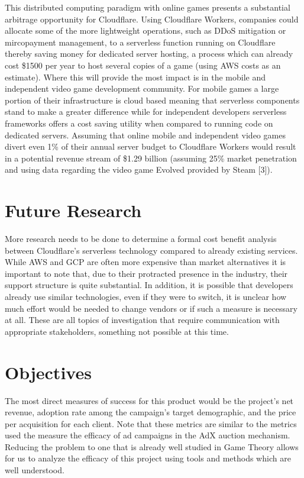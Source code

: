 \documentclass[a4paper, 11pt]{article}
\begin{document}
This distributed computing paradigm with online games presents a substantial arbitrage opportunity for Cloudflare. Using Cloudflare Workers, companies could allocate some of the more lightweight operations, such as DDoS mitigation or mircopayment management, to a serverless function running on Cloudflare thereby saving money for dedicated server hosting, a process which can already cost \$1500 per year to host several copies of a game (using AWS costs as an estimate). Where this will provide the most impact is in the mobile and independent video game development community. For mobile games a large portion of their infrastructure is cloud based meaning that serverless components stand to make a greater difference while for independent developers serverless frameworks offers a cost saving utility when compared to running code on dedicated servers. Assuming that online mobile and independent video games divert even 1\% of their annual server budget to Cloudflare Workers would result in a potential revenue stream of \$1.29 billion (assuming 25\% market penetration and using data regarding the video game Evolved provided by Steam [3]).

\section{Future Research}

More research needs to be done to determine a formal cost benefit analysis between Cloudflare's serverless technology compared to already existing services. While AWS and GCP are often more expensive than market alternatives it is important to note that, due to their protracted presence in the industry, their support structure is quite substantial. In addition, it is possible that developers already use similar technologies, even if they were to switch, it is unclear how much effort would be needed to change vendors or if such a measure is necessary at all. These are all topics of investigation that require communication with appropriate stakeholders, something not possible at this time.

\section{Objectives}

The most direct measures of success for this product would be the project's net revenue, adoption rate among the campaign's target demographic, and the price per acquisition for each client. Note that these metrics are similar to the metrics used the measure the efficacy of ad campaigns in the AdX auction mechanism. Reducing the problem to one that is already well studied in Game Theory allows for us to analyze the efficacy of this project using tools and methods which are well understood. 
\end{document}
